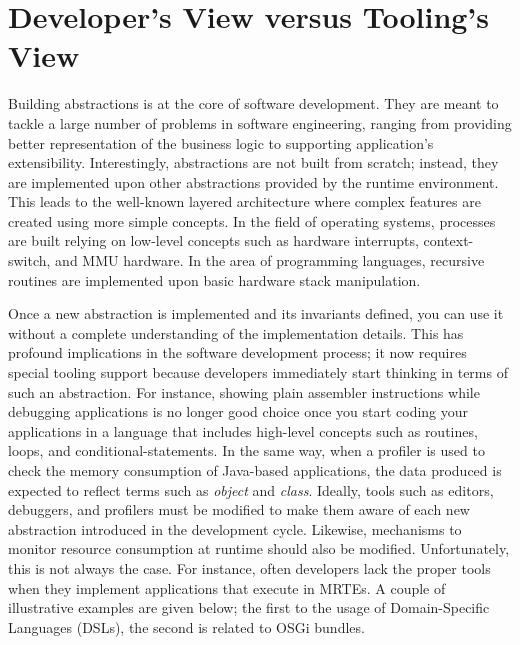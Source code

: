 \section{Developer's View versus Tooling's View} \label{sec:chapter2-introduction}

Building abstractions is at the core of software development.
They are meant to tackle a large number of problems in software engineering, ranging from providing better representation of the business logic to supporting application's extensibility.
Interestingly, abstractions are not built from scratch; instead, they are implemented upon other abstractions provided by the runtime environment.
This leads to the well-known layered architecture where complex features are created using more simple concepts.
In the field of operating systems, processes are built relying on low-level concepts such as hardware interrupts, context-switch, and MMU hardware.
In the area of programming languages, recursive routines are implemented upon basic hardware stack manipulation.

Once a new abstraction is implemented and its invariants defined, you can use it without a complete understanding of the implementation details.
This has profound implications in the software development process; it now requires special tooling support because developers immediately start thinking in terms of such an abstraction.
For instance, showing plain assembler instructions while debugging applications is no longer good choice once you start coding your applications in a language that includes high-level concepts such as routines, loops, and conditional-statements.
In the same way, when a profiler is used to check the memory consumption of Java-based applications, the data produced is expected to reflect terms such as \textit{object} and \textit{class}.
Ideally, tools such as editors, debuggers, and profilers must be modified to make them aware of each new abstraction introduced in the development cycle.
Likewise, mechanisms to monitor resource consumption at runtime should also be modified.
Unfortunately, this is not always the case.
For instance, often developers lack the proper tools when they implement applications that execute in MRTEs.
A couple of illustrative examples are given below; the first to the usage of Domain-Specific Languages (DSLs), the second is related to OSGi bundles.


